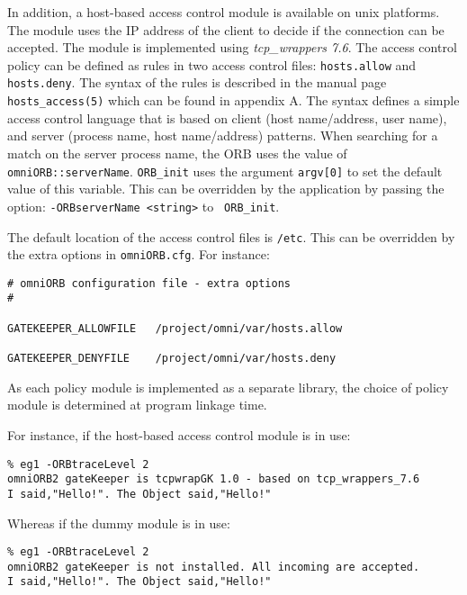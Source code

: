 \documentclass[11pt,twoside,onecolumn]{book}
\begin{document}
In addition, a host-based access control module is available on unix
platforms. The module uses the IP address of the client to decide if the
connection can be accepted. The module is implemented using {\em
tcp\_wrappers 7.6}. The access control policy can be defined as rules in
two access control files: {\tt hosts.allow} and {\tt hosts.deny}. The
syntax of the rules is described in the manual page {\tt hosts\_access(5)}
which can be found in appendix A. The syntax defines a simple access
control language that is based on client (host name/address, user name),
and server (process name, host name/address) patterns. When searching for a
match on the server process name, the ORB uses the value of {\tt
omniORB::serverName}. {\tt ORB\_init} uses the argument {\tt argv[0]} to
set the default value of this variable. This can be overridden by the
application by passing the option: {\tt -ORBserverName <string>} to {\tt
ORB\_init}.

The default location of the access control files is {\tt /etc}. This can be
overridden by the extra options in {\tt omniORB.cfg}. For instance:

{\small
\begin{verbatim}
# omniORB configuration file - extra options
#

GATEKEEPER_ALLOWFILE   /project/omni/var/hosts.allow

GATEKEEPER_DENYFILE    /project/omni/var/hosts.deny

\end{verbatim}
}

As each policy module is implemented as a separate library, the choice of
policy module is determined at program linkage time.

For instance, if the host-based access control module is in use:

{\small
\begin{verbatim}
% eg1 -ORBtraceLevel 2
omniORB2 gateKeeper is tcpwrapGK 1.0 - based on tcp_wrappers_7.6 
I said,"Hello!". The Object said,"Hello!"
\end{verbatim}
}

Whereas if the dummy module is in use:

{\small
\begin{verbatim}
% eg1 -ORBtraceLevel 2
omniORB2 gateKeeper is not installed. All incoming are accepted.
I said,"Hello!". The Object said,"Hello!"
\end{verbatim}
}


\end{document}
